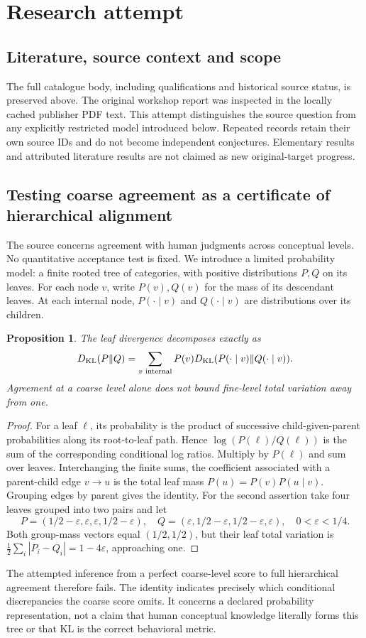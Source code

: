 \documentclass[11pt]{article}
\newtheorem{proposition}{Proposition}
\begin{document}
\section{Research attempt}
\subsection{Literature, source context and scope}
The full catalogue body, including qualifications and historical source status, is preserved above. The original workshop report was inspected in the locally cached publisher PDF text. This attempt distinguishes the source question from any explicitly restricted model introduced below. Repeated records retain their own source IDs and do not become independent conjectures. Elementary results and attributed literature results are not claimed as new original-target progress.

\subsection{Testing coarse agreement as a certificate of hierarchical alignment}
The source concerns agreement with human judgments across conceptual levels. No quantitative acceptance test is fixed. We introduce a limited probability model: a finite rooted tree of categories, with positive distributions $P,Q$ on its leaves. For each node $v$, write $P(v),Q(v)$ for the mass of its descendant leaves. At each internal node, $P(\cdot\mid v)$ and $Q(\cdot\mid v)$ are distributions over its children.
\begin{proposition}
The leaf divergence decomposes exactly as
\[
 D_{\rm KL}(P\|Q)=\sum_{v\text{ internal}} P(v)
 D_{\rm KL}(P(\cdot\mid v)\|Q(\cdot\mid v)).
\]
Agreement at a coarse level alone does not bound fine-level total variation away from one.
\end{proposition}
\begin{proof}
For a leaf $\ell$, its probability is the product of successive child-given-parent probabilities along its root-to-leaf path. Hence $\log(P(\ell)/Q(\ell))$ is the sum of the corresponding conditional log ratios. Multiply by $P(\ell)$ and sum over leaves. Interchanging the finite sums, the coefficient associated with a parent-child edge $v\to u$ is the total leaf mass $P(u)=P(v)P(u\mid v)$. Grouping edges by parent gives the identity.
For the second assertion take four leaves grouped into two pairs and let
\[
 P=(1/2-\varepsilon,\varepsilon,\varepsilon,1/2-\varepsilon),\quad
 Q=(\varepsilon,1/2-\varepsilon,1/2-\varepsilon,\varepsilon),
 \quad0<\varepsilon<1/4.
\]
Both group-mass vectors equal $(1/2,1/2)$, but their leaf total variation is $\tfrac12\sum_i|P_i-Q_i|=1-4\varepsilon$, approaching one.
\end{proof}
The attempted inference from a perfect coarse-level score to full hierarchical agreement therefore fails. The identity indicates precisely which conditional discrepancies the coarse score omits. It concerns a declared probability representation, not a claim that human conceptual knowledge literally forms this tree or that KL is the correct behavioral metric.
\end{document}
